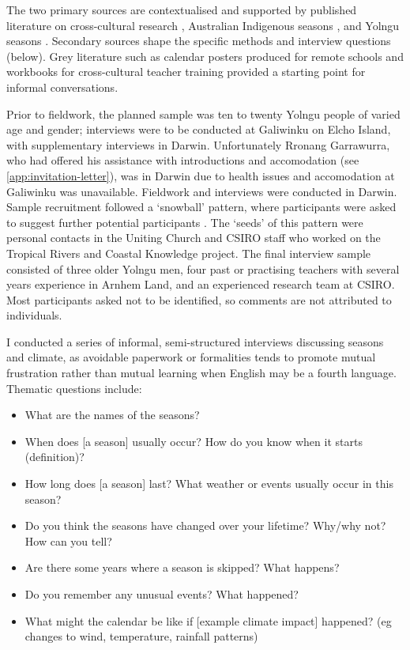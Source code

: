 The two primary sources are contextualised and supported by published
literature on cross-cultural research \citep[eg.][]{smith1999}, Australian
Indigenous seasons \citep[eg.][]{prober2011,oconnor2010}, and Yolngu seasons
\citep{davis1989,atlas2014}.  Secondary sources shape the specific methods
and interview questions (below).  Grey literature such as calendar posters
produced for remote schools and workbooks for cross-cultural teacher
training provided a starting point for informal conversations.


Prior to fieldwork, the planned sample was ten to twenty Yolngu people
of varied age and gender; interviews were to be conducted at Galiwinku
on Elcho Island, with supplementary interviews in Darwin.  Unfortunately
Rronang Garrawurra, who had offered his assistance with introductions
and accomodation (see \cref{app:invitation-letter}), was in Darwin due
to health issues and accomodation at Galiwinku was unavailable.
%
Fieldwork and interviews were conducted in Darwin.  Sample
recruitment followed a `snowball' pattern, where participants were asked
to suggest further potential participants \citep{patrick1996}.  The `seeds'
of this pattern were personal contacts in the Uniting Church and CSIRO
staff who worked on the Tropical Rivers and Coastal Knowledge project.
%
The final interview sample consisted of three older Yolngu men, four past
or practising teachers with several years experience in Arnhem Land, and
an experienced research team at CSIRO.  Most participants asked not to be identified, so comments
are not attributed to individuals.


I conducted a series of informal, semi-structured interviews discussing seasons
and climate, as avoidable paperwork or formalities tends to promote mutual
frustration rather than mutual learning when English may be a fourth language.
Thematic questions include:
\begin{itemize}
\item What are the names of the seasons?
\item When does [a season] usually occur?  How do you know when it starts (definition)?
\item How long does [a season] last?  What weather or events usually occur in this season?
\item Do you think the seasons have changed over your lifetime?  Why/why not?  How can you tell?
\item Are there some years where a season is skipped?  What happens?
\item Do you remember any unusual events?  What happened?
\item What might the calendar be like if [example climate impact] happened?
      (eg changes to wind, temperature, rainfall patterns)
\end{itemize}

